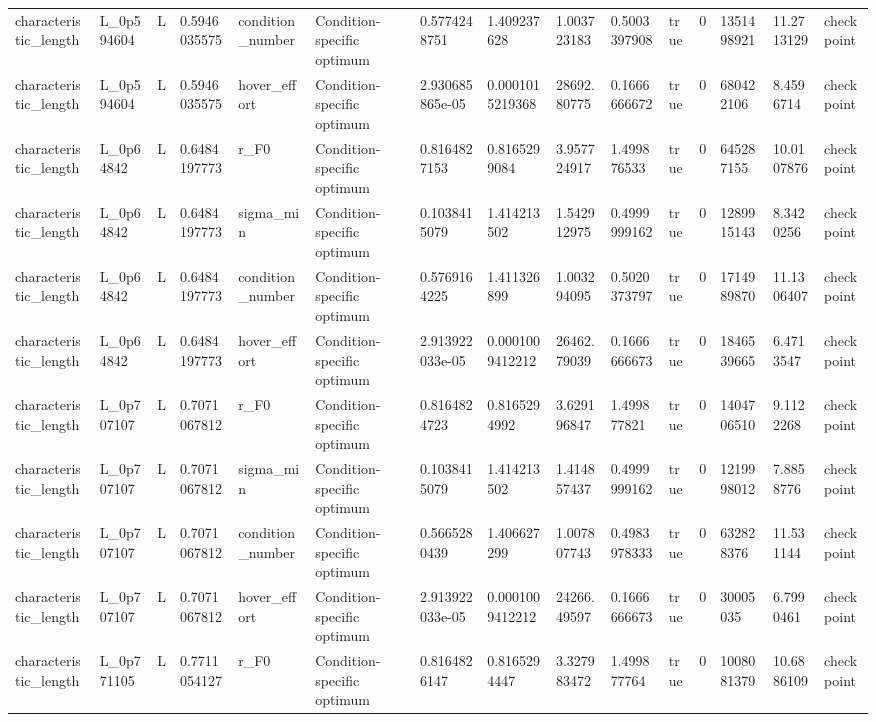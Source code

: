 \begin{tabular}{@{}lllllllllllllll@{}}
characteristic\_length & L\_0p594604 & L & 0.5946035575 & condition\_number & Condition-specific optimum & 0.5774248751 & 1.409237628 & 1.003723183 & 0.5003397908 & true & 0 & 1351498921 & 11.2713129 & checkpoint \\
characteristic\_length & L\_0p594604 & L & 0.5946035575 & hover\_effort & Condition-specific optimum & 2.930685865e-05 & 0.0001015219368 & 28692.80775 & 0.1666666672 & true & 0 & 680422106 & 8.4596714 & checkpoint \\
characteristic\_length & L\_0p64842 & L & 0.6484197773 & r\_F0 & Condition-specific optimum & 0.8164827153 & 0.8165299084 & 3.957724917 & 1.499876533 & true & 0 & 645287155 & 10.0107876 & checkpoint \\
characteristic\_length & L\_0p64842 & L & 0.6484197773 & sigma\_min & Condition-specific optimum & 0.1038415079 & 1.414213502 & 1.542912975 & 0.4999999162 & true & 0 & 1289915143 & 8.3420256 & checkpoint \\
characteristic\_length & L\_0p64842 & L & 0.6484197773 & condition\_number & Condition-specific optimum & 0.5769164225 & 1.411326899 & 1.003294095 & 0.5020373797 & true & 0 & 1714989870 & 11.1306407 & checkpoint \\
characteristic\_length & L\_0p64842 & L & 0.6484197773 & hover\_effort & Condition-specific optimum & 2.913922033e-05 & 0.0001009412212 & 26462.79039 & 0.1666666673 & true & 0 & 1846539665 & 6.4713547 & checkpoint \\
characteristic\_length & L\_0p707107 & L & 0.7071067812 & r\_F0 & Condition-specific optimum & 0.8164824723 & 0.8165294992 & 3.629196847 & 1.499877821 & true & 0 & 1404706510 & 9.1122268 & checkpoint \\
characteristic\_length & L\_0p707107 & L & 0.7071067812 & sigma\_min & Condition-specific optimum & 0.1038415079 & 1.414213502 & 1.414857437 & 0.4999999162 & true & 0 & 1219998012 & 7.8858776 & checkpoint \\
characteristic\_length & L\_0p707107 & L & 0.7071067812 & condition\_number & Condition-specific optimum & 0.5665280439 & 1.406627299 & 1.007807743 & 0.4983978333 & true & 0 & 632828376 & 11.531144 & checkpoint \\
characteristic\_length & L\_0p707107 & L & 0.7071067812 & hover\_effort & Condition-specific optimum & 2.913922033e-05 & 0.0001009412212 & 24266.49597 & 0.1666666673 & true & 0 & 30005035 & 6.7990461 & checkpoint \\
characteristic\_length & L\_0p771105 & L & 0.7711054127 & r\_F0 & Condition-specific optimum & 0.8164826147 & 0.8165294447 & 3.327983472 & 1.499877764 & true & 0 & 1008081379 & 10.6886109 & checkpoint \\

\end{tabular}
